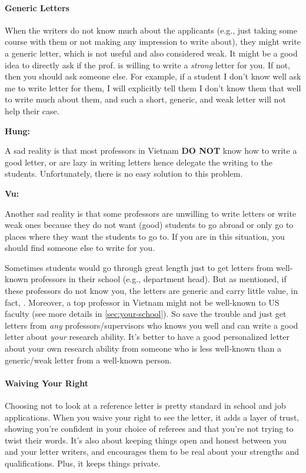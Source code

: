 \documentclass[oneside,11pt]{memoir}
\newenvironment{commentbox}[1][]{
  \small
  \begin{mybox}
    {\small \textbf{#1}}
  }{
  \end{mybox}
}
\newcommand{\red}[1]{{\color{red}{#1}}}
\begin{document}
\paragraph{Generic Letters} When the writers do not know much about the applicants (e.g., just taking some course with them or not making any impression to write about), they might write a generic letter, which is not useful and also considered weak.  It might be a good idea to directly ask if the prof. is willing to write a \emph{strong} letter for you. If not, then you should ask someone else.  For example, if a student I don't know well ask me to write letter for them, I will explicitly tell them I don't know them that well to write much about them, and such a short, generic, and weak letter will not help their case.

\begin{commentbox}[Hung:]
  A sad reality is that most professors in Vietnam \textbf{DO NOT} know how to write a good letter, or are lazy in writing letters hence delegate the writing to the students. Unfortunately, there is no easy solution to this problem.
\end{commentbox}

\begin{commentbox}[Vu:]

  Another sad reality is that some professors are unwilling to write letters or write weak ones because they do not want (good) students to go abroad or only go to places where they want the students to go to. If you are in this situation, you should find someone else to write for you.
  \tcblower

  Sometimes students would go through great length just to get letters from well-known professors in their school (e.g., department head). But as mentioned, if these professors do not know you, the letters are generic and carry little value, in fact, \red{red flags}. Moreover, a top professor in Vietnam might not be well-known to US faculty (see more details in \autoref{sec:your-school}). So save the trouble and just get letters from \emph{any} professors/supervisors who knows you well and can write a good letter about \emph{your} research ability. It's better to have a good personalized
  letter about your own research ability from someone who is less
  well-known than a generic/weak letter from a well-known person.
  
\end{commentbox}

\paragraph{Waiving Your Right}  Choosing not to look at a reference letter is pretty standard in school and job applications. When you waive your right to see the letter, it adds a layer of trust, showing you're confident in your choice of referees and that you're not trying to twist their words. It's also about keeping things open and honest between you and your letter writers, and encourages them to be real about your strengths and qualifications. Plus, it keeps things private.
\end{document}
